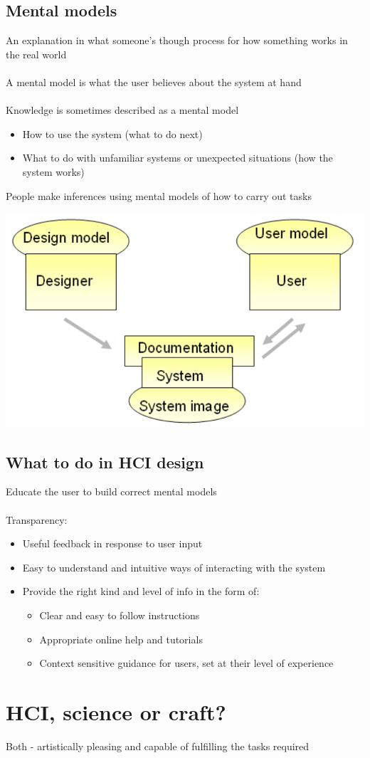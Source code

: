\documentclass{article}[18pt]
\begin{document}
\subsection{Mental models}
An explanation in what someone's though process for how something works in the real world\\
\\
A mental model is what the user believes about the system at hand\\
\\
Knowledge is sometimes described as a mental model
\begin{itemize}
	\item How to use the system (what to do next)
	\item What to do with unfamiliar systems or unexpected situations (how the system works)
\end{itemize}
People make inferences using mental models of how to carry out tasks
\begin{center}
	\includegraphics[scale=0.7]{Conceptual}
\end{center}
\subsection{What to do in HCI design}
Educate the user to build correct mental models\\
\\
Transparency:
\begin{itemize}
	\item Useful feedback in response to user input
	\item Easy to understand and intuitive ways of interacting with the system
	\item Provide the right kind and level of info in the form of:
	\begin{itemize}
		\item Clear and easy to follow instructions
		\item Appropriate online help and tutorials
		\item Context sensitive guidance for users, set at their level of experience 
	\end{itemize}
\end{itemize}
\section{HCI, science or craft?}
Both - artistically pleasing and capable of fulfilling the tasks required
\end{document}
